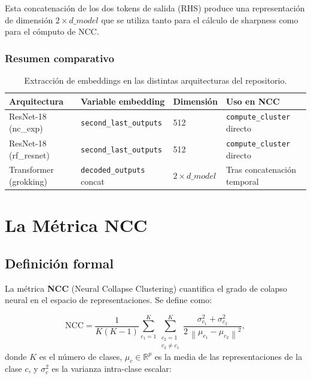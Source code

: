 \documentclass[12pt,a4paper]{report}
\newcommand{\R}{\mathbb{R}}
\newcommand{\norm}[1]{\left\lVert#1\right\rVert}
\newcommand{\NCC}{\text{NCC}}
\begin{document}
Esta concatenación de los dos tokens de salida (RHS) produce una representación de dimensión $2 \times d\_model$ que se utiliza tanto para el cálculo de sharpness como para el cómputo de NCC.

\subsection{Resumen comparativo}

\begin{table}[h]
\centering
\begin{tabular}{p{3.5cm} p{4cm} p{3cm} p{3cm}}
\hline\hline
\textbf{Arquitectura} & \textbf{Variable embedding} & \textbf{Dimensión} & \textbf{Uso en NCC} \\
\hline
ResNet-18 (nc\_exp) & \texttt{second\_last\_outputs} & 512 & \texttt{compute\_cluster} directo \\
ResNet-18 (rf\_resnet) & \texttt{second\_last\_outputs} & 512 & \texttt{compute\_cluster} directo \\
Transformer (grokking) & \texttt{decoded\_outputs} concat & $2\times d\_model$ & Tras concatenación temporal \\
\hline\hline
\end{tabular}
\caption{Extracción de embeddings en las distintas arquitecturas del repositorio.}
\label{tab:embedding_extraction}
\end{table}

\chapter{La Métrica NCC}
\label{chap:ncc}

\section{Definición formal}

La métrica \textbf{NCC} (Neural Collapse Clustering) cuantifica el grado de colapso neural en el espacio de representaciones. Se define como:

\begin{equation}
    \NCC = \frac{1}{K(K-1)} \sum_{c_1=1}^K \sum_{\substack{c_2=1 \\ c_2 \neq c_1}}^K
    \frac{\sigma_{c_1}^2 + \sigma_{c_2}^2}{2 \,\norm{\mu_{c_1} - \mu_{c_2}}^2},
\end{equation}
donde $K$ es el número de clases, $\mu_c \in \R^p$ es la media de las representaciones de la clase $c$, y $\sigma_c^2$ es la varianza intra-clase escalar:
\end{document}
